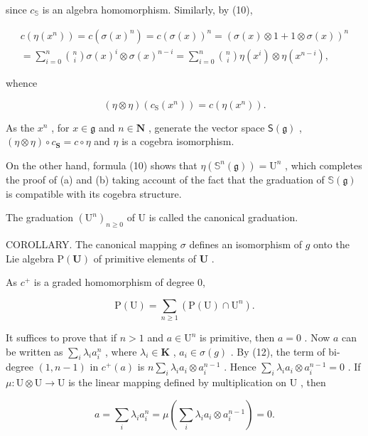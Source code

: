 since \(c_{\mathbb{S}}\) is an algebra homomorphism. Similarly, by (10),

\[
\begin{array}{l} c (\eta (x ^ {n})) = c (\sigma (x) ^ {n}) = c (\sigma (x)) ^ {n} = (\sigma (x) \otimes 1 + 1 \otimes \sigma (x)) ^ {n} \\ = \sum_ {i = 0} ^ {n} \binom {n} {i} \sigma (x) ^ {i} \otimes \sigma (x) ^ {n - i} = \sum_ {i = 0} ^ {n} \binom {n} {i} \eta (x ^ {i}) \otimes \eta (x ^ {n - i}), \end{array}\tag{12}
\]

whence

\[
(\eta \otimes \eta) (c _ {\mathrm{S}} (x ^ {n})) = c (\eta (x ^ {n})).
\]

As the \(x^n\) , for \(x \in \mathfrak{g}\) and \(n \in \mathbf{N}\) , generate the vector space \(\mathsf{S}(\mathfrak{g})\) , \((\eta \otimes \eta) \circ c_{\mathbf{S}} = c \circ \eta\) and \(\eta\) is a cogebra isomorphism.

On the other hand, formula (10) shows that \(\eta(\mathbb{S}^n(\mathfrak{g})) = \mathrm{U}^n\) , which completes the proof of (a) and (b) taking account of the fact that the graduation of \(\mathbb{S}(\mathfrak{g})\) is compatible with its cogebra structure.

The graduation \((\mathrm{U}^{n})_{n\geqslant0}\) of U is called the canonical graduation.

COROLLARY. The canonical mapping \(\sigma\) defines an isomorphism of \(g\) onto the Lie algebra \(\mathrm{P}(\mathbf{U})\) of primitive elements of \(\mathbf{U}\) .

As \(c^{+}\) is a graded homomorphism of degree 0,

\[
\mathrm{P} (\mathrm{U}) = \sum_ {n \geqslant 1} (\mathrm{P} (\mathrm{U}) \cap \mathrm{U} ^ {n}).
\]

It suffices to prove that if \(n > 1\) and \(a \in \mathrm{U}^n\) is primitive, then \(a = 0\) . Now \(a\) can be written as \(\sum_{i} \lambda_i a_i^n\) , where \(\lambda_i \in \mathbf{K}\) , \(a_i \in \sigma(g)\) . By (12), the term of bi-degree \((1, n - 1)\) in \(c^+(a)\) is \(n \sum_{i} \lambda_i a_i \otimes a_i^{n-1}\) . Hence \(\sum_{i} \lambda_i a_i \otimes a_i^{n-1} = 0\) . If \(\mu: \mathrm{U} \otimes \mathrm{U} \to \mathrm{U}\) is the linear mapping defined by multiplication on \(\mathrm{U}\) , then

\[
a = \sum_ {i} \lambda_ {i} a _ {i} ^ {n} = \mu \left(\sum_ {i} \lambda_ {i} a _ {i} \otimes a _ {i} ^ {n - 1}\right) = 0.
\]

